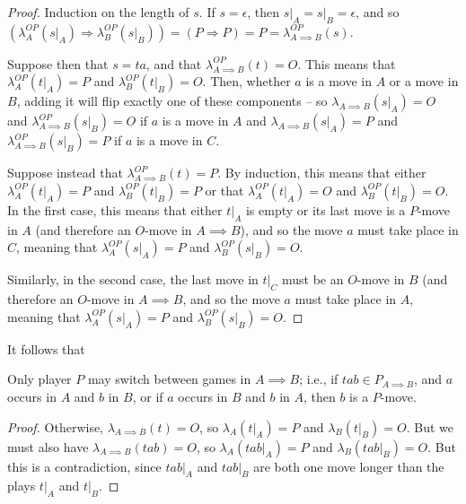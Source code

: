 \documentclass[11pt]{report}
\begin{document}
\begin{proof}
  Induction on the length of $s$.
  If $s=\epsilon$, then $s\vert_A=s\vert_B=\epsilon$, and so $(\lambda_A^{OP}(s\vert_A)\Rightarrow \lambda_B^{OP}(s\vert_B)) = (P\Rightarrow P) = P = \lambda_{A\implies B}^{OP}(s)$.  

  Suppose then that $s=ta$, and that $\lambda_{A\implies B}^{OP}(t)=O$.  
  This means that $\lambda_A^{OP}(t\vert_A)=P$ and $\lambda_B^{OP}(t\vert_B)=O$.
  Then, whether $a$ is a move in $A$ or a move in $B$, adding it will flip exactly one of these components -- so $\lambda_{A\implies B}(s\vert_A)=O$ and $\lambda_{A\implies B}^{OP}(s\vert_B)=O$ if $a$ is a move in $A$ and $\lambda_{A\implies B}(s\vert_A)=P$ and $\lambda_{A\implies B}^{OP}(s\vert_B)=P$ if $a$ is a move in $C$.

  Suppose instead that $\lambda_{A\implies B}^{OP}(t)=P$.  
  By induction, this means that either $\lambda_A^{OP}(t\vert_A)=P$ and $\lambda_B^{OP}(t\vert_B)=P$ or that $\lambda_A^{OP}(t\vert_A)=O$ and $\lambda_B^{OP}(t\vert_B)=O$.
  In the first case, this means that either $t\vert_A$ is empty or its last move is a $P$-move in $A$ (and therefore an $O$-move in $A\implies B$), and so the move $a$ must take place in $C$, meaning that $\lambda_A^{OP}(s\vert_A)=P$ and $\lambda_B^{OP}(s\vert_B)=O$.  

  Similarly, in the second case, the last move in $t\vert_C$ must be an $O$-move in $B$ (and therefore an $O$-move in $A\implies B$, and so the move $a$ must take place in $A$, meaning that $\lambda_A^{OP}(s\vert_A)=P$ and $\lambda_B^{OP}(s\vert_B)=O$.  
\end{proof}

It follows that

\begin{corollary}
  Only player $P$ may switch between games in $A\implies B$; i.e., if $tab\in P_{A\implies B}$, and $a$ occurs in $A$ and $b$ in $B$, or if $a$ occurs in $B$ and $b$ in $A$, then $b$ is a $P$-move.
  \label{CorSwitchingCondition}
\end{corollary}
\begin{proof}
  Otherwise, $\lambda_{A\implies B}(t)=O$, so $\lambda_A(t\vert_A)=P$ and $\lambda_B(t\vert_B)=O$.  
  But we must also have $\lambda_{A\implies B}(tab)=O$, so $\lambda_A(tab\vert_A)=P$ and $\lambda_B(tab\vert_B)=O$.  
  But this is a contradiction, since $tab\vert_A$ and $tab\vert_B$ are both one move longer than the plays $t\vert_A$ and $t\vert_B$.
\end{proof}
\end{document}
